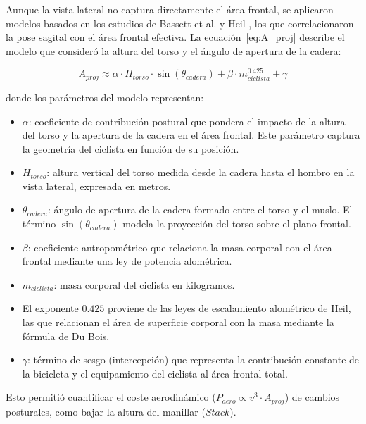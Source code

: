 Aunque la vista lateral no captura directamente el área frontal, se aplicaron
modelos basados en los estudios de Bassett et al.
\citep{Bassett1999_HourRecord} y Heil \citep{Heil2001_BodyMassScaling}, los que
correlacionaron la pose sagital con el área frontal efectiva. La ecuación~\ref{eq:A_proj} describe el modelo que consideró la altura del torso y el ángulo de apertura de la cadera:

\begin{equation}
  \label{eq:A_proj}
  A_{proj} \approx \alpha \cdot H_{torso} \cdot \sin(\theta_{cadera}) + \beta \cdot m_{ciclista}^{0.425} + \gamma
\end{equation}

donde los parámetros del modelo representan:

\begin{itemize}
  \item $\alpha$: coeficiente de contribución postural que pondera el impacto de la
        altura del torso y la apertura de la cadera en el área frontal. Este parámetro
        captura la geometría del ciclista en función de su posición.
  \item $H_{torso}$: altura vertical del torso medida desde la cadera hasta el hombro
        en la vista lateral, expresada en metros.
  \item $\theta_{cadera}$: ángulo de apertura de la cadera formado entre el torso y el
        muslo. El término $\sin(\theta_{cadera})$ modela la proyección del torso sobre
        el plano frontal.
  \item $\beta$: coeficiente antropométrico que relaciona la masa corporal con el área
        frontal mediante una ley de potencia alométrica.
  \item $m_{ciclista}$: masa corporal del ciclista en kilogramos.
  \item El exponente $0.425$ proviene de las leyes de escalamiento alométrico de Heil,
        las que relacionan el área de superficie corporal con la masa mediante la
        fórmula de Du Bois.
  \item $\gamma$: término de sesgo (intercepción) que representa la contribución
        constante de la bicicleta y el equipamiento del ciclista al área frontal total.
\end{itemize}

Esto permitió cuantificar el coste aerodinámico ($P_{aero} \propto v^3 \cdot
  A_{proj}$) de cambios posturales, como bajar la altura del manillar ($Stack$).

